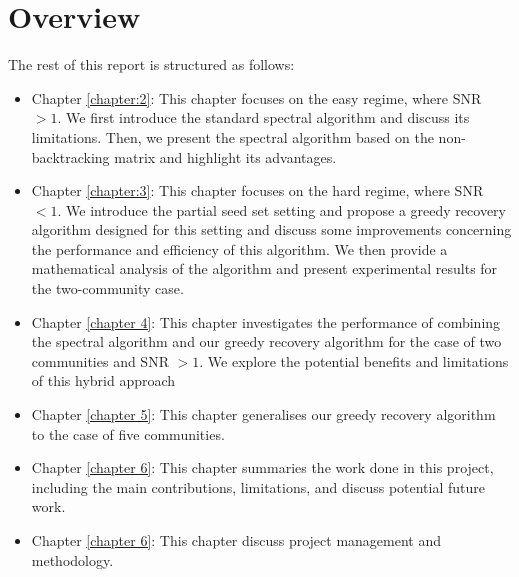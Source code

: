 \section{Overview}
The rest of this report is structured as follows:
\begin{itemize}
    \item Chapter \ref{chapter:2}: This chapter focuses on the easy regime, where SNR $>1.$ We first introduce the standard spectral algorithm and discuss its limitations. Then, we present the spectral algorithm based on the non-backtracking matrix and highlight its advantages.
    \item Chapter \ref{chapter:3}: This chapter focuses on the hard regime, where SNR $<1.$ We introduce the partial seed set setting and propose a greedy recovery algorithm designed for this setting and discuss some improvements concerning the performance and efficiency of this algorithm. We then provide a mathematical analysis of the algorithm and present experimental results for the two-community case.
    \item Chapter \ref{chapter 4}: This chapter investigates the performance of combining the spectral algorithm and our greedy recovery algorithm for the case of two communities and SNR $>1.$ We explore the potential benefits and limitations of this hybrid approach
    \item Chapter \ref{chapter 5}: This chapter generalises our greedy recovery algorithm to the case of five communities.
    \item Chapter \ref{chapter 6}: This chapter summaries the work done in this project, including the main contributions, limitations, and discuss potential future work.
    \item Chapter \ref{chapter 6}: This chapter discuss project management and methodology.
\end{itemize}
